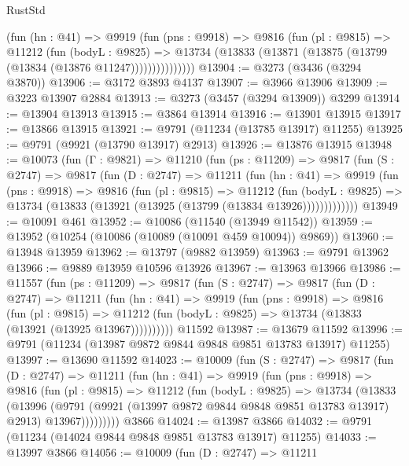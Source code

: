 \begin{lexlean}{RustStd}
\begin{coremodule}
              (fun (hn : @41) =>
              @9919
                (fun (pns : @9918) =>
                @9816
                  (fun (pl : @9815) =>
                  @11212
                    (fun (bodyL : @9825) =>
                    @13734 (@13833 (@13871 (@13875 (@13799 (@13834 (@13876 @11247)))))))))))))))
@13904 := @3273 (@3436 (@3294 @3870))
@13906 := @3172 @3893 @4137
@13907 := @3966 @13906
@13909 := @3223 @13907 @2884
@13913 := @3273 (@3457 (@3294 @13909)) @3299
@13914 := @13904 @13913
@13915 := @3864 @13914
@13916 := @13901 @13915
@13917 := @13866 @13915
@13921 := @9791 (@11234 (@13785 @13917) @11255)
@13925 := @9791 (@9921 (@13790 @13917) @2913)
@13926 := @13876 @13915
@13948 := @10073
    (fun (Γ : @9821) =>
    @11210
      (fun (ps : @11209) =>
      @9817
        (fun (S : @2747) =>
        @9817
          (fun (D : @2747) =>
          @11211
            (fun (hn : @41) =>
            @9919
              (fun (pns : @9918) =>
              @9816
                (fun (pl : @9815) =>
                @11212
                  (fun (bodyL : @9825) =>
                  @13734 (@13833 (@13921 (@13925 (@13799 (@13834 @13926)))))))))))))
@13949 := @10091 @461
@13952 := @10086 (@11540 (@13949 @11542))
@13959 := @13952 (@10254 (@10086 (@10089 (@10091 @459 @10094)) @9869))
@13960 := @13948 @13959
@13962 := @13797 (@9882 @13959)
@13963 := @9791 @13962
@13966 := @9889 @13959 @10596 @13926
@13967 := @13963 @13966
@13986 := @11557
    (fun (ps : @11209) =>
    @9817
      (fun (S : @2747) =>
      @9817
        (fun (D : @2747) =>
        @11211
          (fun (hn : @41) =>
          @9919
            (fun (pns : @9918) =>
            @9816
              (fun (pl : @9815) =>
              @11212 (fun (bodyL : @9825) => @13734 (@13833 (@13921 (@13925 @13967))))))))))
    @11592
@13987 := @13679 @11592
@13996 := @9791 (@11234 (@13987 @9872 @9844 @9848 @9851 @13783 @13917) @11255)
@13997 := @13690 @11592
@14023 := @10009
    (fun (S : @2747) =>
    @9817
      (fun (D : @2747) =>
      @11211
        (fun (hn : @41) =>
        @9919
          (fun (pns : @9918) =>
          @9816
            (fun (pl : @9815) =>
            @11212
              (fun (bodyL : @9825) =>
              @13734
                (@13833
                  (@13996
                    (@9791
                      (@9921 (@13997 @9872 @9844 @9848 @9851 @13783 @13917) @2913)
                      @13967)))))))))
    @3866
@14024 := @13987 @3866
@14032 := @9791 (@11234 (@14024 @9844 @9848 @9851 @13783 @13917) @11255)
@14033 := @13997 @3866
@14056 := @10009
    (fun (D : @2747) =>
    @11211

\end{coremodule}
\end{lexlean}
